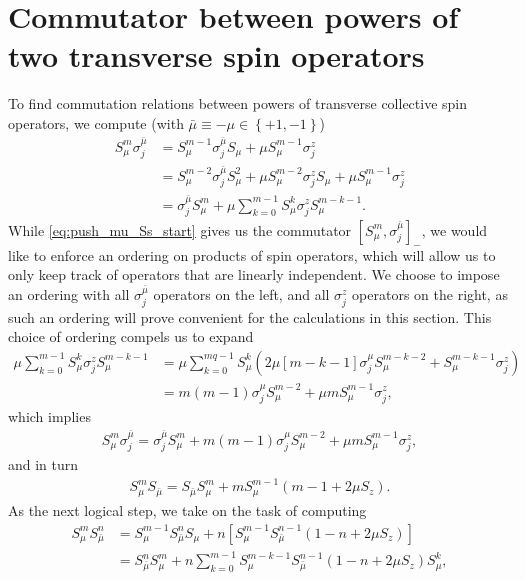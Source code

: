 \documentclass[aps,notitlepage,nofootinbib,11pt]{revtex4-1}
\newcommand{\p}[1]{\left(#1\right)} %
\renewcommand{\sp}[1]{\left[#1\right]} %
\renewcommand{\set}[1]{\left\{#1\right\}} %
\newcommand{\bmu}{{\bar\mu}}
\newcommand{\1}{\mathds{1}}
\begin{document}
\section{Commutator between powers of two transverse spin operators}
\label{sec:comm_transverse}

To find commutation relations between powers of transverse collective
spin operators, we compute (with $\bmu\equiv-\mu\in\set{+1,-1}$)
\begin{align}
  S_\mu^m \sigma_j^\bmu
  &= S_\mu^{m-1}\sigma_j^\bmu S_\mu + \mu S_\mu^{m-1} \sigma_j^z \\
  &= S_\mu^{m-2} \sigma_j^\bmu S_\mu^2 + \mu S_\mu^{m-2} \sigma_j^z S_\mu
  + \mu S_\mu^{m-1} \sigma_j^z \\
  &= \sigma_j^\bmu S_\mu^m
  + \mu \sum_{k=0}^{m-1} S_\mu^k \sigma_j^z S_\mu^{m-k-1}
  \label{eq:push_mu_Ss_start}.
\end{align}
While \eqref{eq:push_mu_Ss_start} gives us the commutator
$\sp{S_\mu^m,\sigma_j^\bmu}_-$, we would like to enforce an ordering
on products of spin operators, which will allow us to only keep track
of operators that are linearly independent.  We choose to impose an
ordering with all $\sigma_j^\bmu$ operators on the left, and all
$\sigma_j^z$ operators on the right, as such an ordering will prove
convenient for the calculations in this section.  This choice of
ordering compels us to expand
\begin{align}
  \mu \sum_{k=0}^{m-1} S_\mu^k \sigma_j^z S_\mu^{m-k-1}
  &= \mu \sum_{k=0}^{mq-1} S_\mu^k
  \p{2\mu\sp{m-k-1} \sigma_j^\mu S_\mu^{m-k-2}
    + S_\mu^{m-k-1} \sigma_j^z} \\
  &= m \p{m-1} \sigma_j^\mu S_\mu^{m-2} + \mu m S_\mu^{m-1} \sigma_j^z,
\end{align}
which implies
\begin{align}
  S_\mu^m \sigma_j^\bmu
  = \sigma_j^\bmu S_\mu^m + m \p{m-1} \sigma_j^\mu S_\mu^{m-2}
  + \mu m S_\mu^{m-1} \sigma_j^z,
  \label{eq:push_mu_Ss}
\end{align}
and in turn
\begin{align}
  S_\mu^m S_\bmu = S_\bmu S_\mu^m
  + m S_\mu^{m-1} \p{m - 1 + 2\mu S_z}.
  \label{eq:push_mu_single}
\end{align}
As the next logical step, we take on the task of computing
\begin{align}
  S_\mu^m S_\bmu^n
  &= S_\mu^{m-1} S_\bmu^n S_\mu
  + n \sp{S_\mu^{m-1} S_\bmu^{n-1} \p{1 - n + 2\mu S_z}} \\
  &= S_\bmu^n S_\mu^m
  + n \sum_{k=0}^{m-1} S_\mu^{m-k-1} S_\bmu^{n-1}
  \p{1 - n + 2\mu S_z} S_\mu^k,
\end{align}
\end{document}
